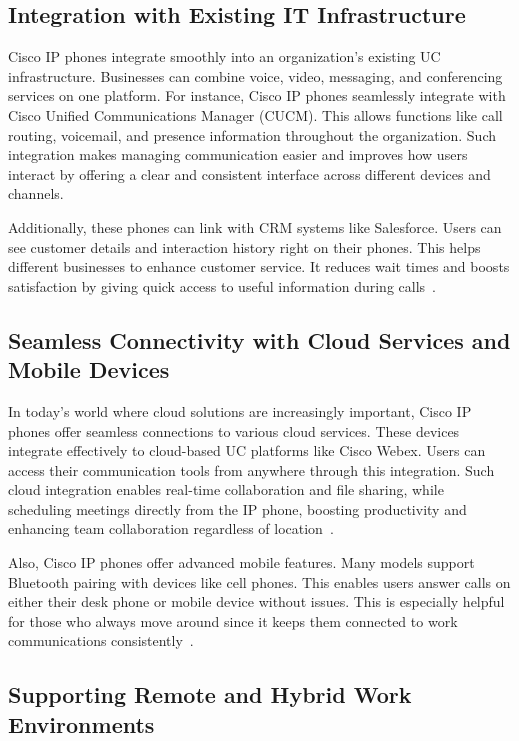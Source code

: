 \documentclass[11pt,a4paper]{article}
\begin{document}
\subsection*{Integration with Existing IT Infrastructure}

Cisco IP phones integrate smoothly into an organization’s existing UC infrastructure. Businesses can combine voice, video, messaging, and conferencing services on one platform. For instance, Cisco IP phones seamlessly integrate with Cisco Unified Communications Manager (CUCM). This allows functions like call routing, voicemail, and presence information throughout the organization. Such integration makes managing communication easier and improves how users interact by offering a clear and consistent interface across different devices and channels.

Additionally, these phones can link with CRM systems like Salesforce. Users can see customer details and interaction history right on their phones. This helps different businesses to enhance customer service. It reduces wait times and boosts satisfaction by giving quick access to useful information during calls~\cite{CRM}.

\subsection*{Seamless Connectivity with Cloud Services and Mobile Devices}

In today’s world where cloud solutions are increasingly important, Cisco IP phones offer seamless connections to various cloud services. These devices integrate effectively to cloud-based UC platforms like Cisco Webex. Users can access their communication tools from anywhere through this integration. Such cloud integration enables real-time collaboration and file sharing, while scheduling meetings directly from the IP phone, boosting productivity and enhancing team collaboration regardless of location~\cite{Cloud}.

Also, Cisco IP phones offer advanced mobile features. Many models support Bluetooth pairing with devices like cell phones. This enables users answer calls on either their desk phone or mobile device without issues. This is especially helpful for those who always move around since it keeps them connected to work communications consistently~\cite{Mobile-Device}.


\subsection*{Supporting Remote and Hybrid Work Environments}
\end{document}
